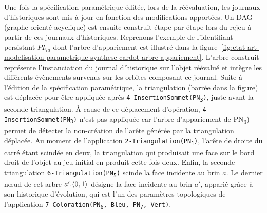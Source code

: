 Une fois la spécification paramétrique éditée, lors de la réévaluation, les journaux d'historiques sont mis à jour en fonction des modifications apportées. Un DAG
(graphe orienté acyclique) est ensuite construit étape par étape lors du rejeu à partir de ces journaux d'historiques. %
Reprenons l'exemple de l'identifiant persistant \(PI_{7a}\) dont l'arbre d'appariement est illustré dans la
figure~\ref{fig:etat-art-modelisation-parametrique-synthese-cardot-arbre-appariement}. %
L'arbre construit représente l'instanciation du journal d'historique sur l'objet réévalué et intègre les différents évènements survenus sur les orbites composant ce journal.
Suite à l'édition de la spécification paramétrique, la triangulation (barrée dans la figure) est déplacée pour être appliquée après \texttt{4-InsertionSommet(PN\textsubscript{3})}, juste avant la seconde triangulation. %
À cause de ce déplacement d'opération, \texttt{4-InsertionSommet(PN\textsubscript{3})} n'est pas appliquée car l'arbre d'appariement de PN\textsubscript{3}) permet de détecter la non-création de l'arête générée par la triangulation déplacée. %
Au moment de l'application \texttt{2-Triangulation(PN\textsubscript{1})}, l'arête de droite du carré étant scindée en deux, la triangulation qui produisait une face sur le bord droit de l'objet au jeu initial en produit cette fois deux. %
Enfin, la seconde triangulation \texttt{6-Triangulation(PN\textsubscript{5})} scinde la face incidente au brin \(a\). %
Le dernier n\oe ud de cet arbre \(a'.\langle0,1\rangle\) désigne la face incidente au brin \(a'\), apparié grâce à son historique d'évolution, qui est l'un des paramètres topologiques de l'application \texttt{7-Coloration(PN\textsubscript{6}, Bleu, PN\textsubscript{7}, Vert)}. %

